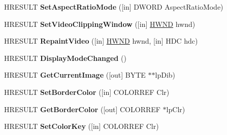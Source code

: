 \begin{DoxyCompactItemize}
\item 
\mbox{\label{interface_i_v_m_r_windowless_control_a4c5fa0e17e7cc4e63b6c094a8cde3e9b}} 
H\+R\+E\+S\+U\+LT {\bfseries Set\+Aspect\+Ratio\+Mode} (\mbox{[}in\mbox{]} D\+W\+O\+RD Aspect\+Ratio\+Mode)
\item 
\mbox{\label{interface_i_v_m_r_windowless_control_abc32920e16b7b149726f01b560bbd4b7}} 
H\+R\+E\+S\+U\+LT {\bfseries Set\+Video\+Clipping\+Window} (\mbox{[}in\mbox{]} \hyperlink{interfacevoid}{H\+W\+ND} hwnd)
\item 
\mbox{\label{interface_i_v_m_r_windowless_control_a05e6c709ff5136043b3873604d3e2ecd}} 
H\+R\+E\+S\+U\+LT {\bfseries Repaint\+Video} (\mbox{[}in\mbox{]} \hyperlink{interfacevoid}{H\+W\+ND} hwnd, \mbox{[}in\mbox{]} H\+DC hdc)
\item 
\mbox{\label{interface_i_v_m_r_windowless_control_a8801ed94e02beaf8e5b2a3d372116a01}} 
H\+R\+E\+S\+U\+LT {\bfseries Display\+Mode\+Changed} ()
\item 
\mbox{\label{interface_i_v_m_r_windowless_control_a39645cb58eb3e00b3fb75237e8a0e4cd}} 
H\+R\+E\+S\+U\+LT {\bfseries Get\+Current\+Image} (\mbox{[}out\mbox{]} B\+Y\+TE $\ast$$\ast$lp\+Dib)
\item 
\mbox{\label{interface_i_v_m_r_windowless_control_a7c511a2de5b2db2d09e44249aa5d77b8}} 
H\+R\+E\+S\+U\+LT {\bfseries Set\+Border\+Color} (\mbox{[}in\mbox{]} C\+O\+L\+O\+R\+R\+EF Clr)
\item 
\mbox{\label{interface_i_v_m_r_windowless_control_ad5204f89eed1f81d1837f5f8e0135a48}} 
H\+R\+E\+S\+U\+LT {\bfseries Get\+Border\+Color} (\mbox{[}out\mbox{]} C\+O\+L\+O\+R\+R\+EF $\ast$lp\+Clr)
\item 
\mbox{\label{interface_i_v_m_r_windowless_control_aadc184a999bdd0b9afd9e5bd94576414}} 
H\+R\+E\+S\+U\+LT {\bfseries Set\+Color\+Key} (\mbox{[}in\mbox{]} C\+O\+L\+O\+R\+R\+EF Clr)
\item 
$$
\end{DoxyCompactItemize}
